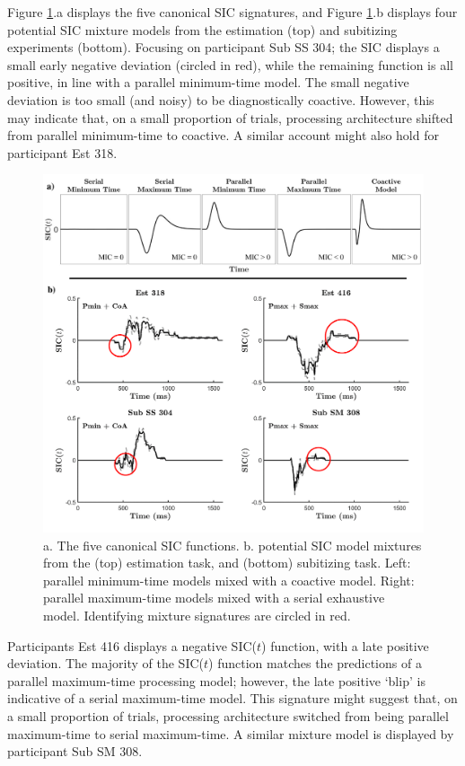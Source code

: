 Figure \ref{fig:subSICmix}.a displays the five canonical SIC signatures, and Figure \ref{fig:subSICmix}.b displays four potential SIC mixture models from the estimation (top) and subitizing experiments (bottom). Focusing on participant Sub SS 304; the SIC displays a small early negative deviation (circled in red), while the remaining function is all positive, in line with a parallel minimum-time model. The small negative deviation is too small (and noisy) to be diagnostically coactive. However, this may indicate that, on a small proportion of trials, processing architecture shifted from parallel minimum-time to coactive. A similar account might also hold for participant Est 318. 

\begin{figure}[hbt]
\centering \includegraphics[width=\linewidth]{Figures/Subitizing/MixtureFigure.pdf}
\caption{a. The five canonical SIC functions. b. potential SIC model mixtures from the (top) estimation task, and (bottom) subitizing task. Left: parallel minimum-time models mixed with a coactive model. Right: parallel maximum-time models mixed with a serial exhaustive model. Identifying mixture signatures are circled in red.}
\label{fig:subSICmix}
\end{figure}

Participants Est 416 displays a negative SIC($t$) function, with a late positive deviation. The majority of the SIC($t$) function matches the predictions of a parallel maximum-time processing model; however, the late positive `blip' is indicative of a serial maximum-time model. This signature might suggest that, on a small proportion of trials, processing architecture switched from being parallel maximum-time to serial maximum-time. A similar mixture model is displayed by participant Sub SM 308. 

